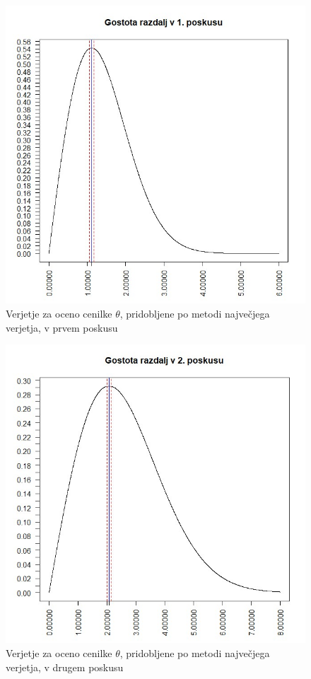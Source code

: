 \documentclass[a4paper, 10pt]{article}
\begin{document}
	\begin{figure}[h!]
		\label{fig: 2Dplot1}
		\centering
		\includegraphics[scale = 0.4]{VerjetjeMNV1}
		\caption{Verjetje za oceno cenilke $\theta$, pridobljene po metodi največjega verjetja, v prvem poskusu}
	\end{figure}

	\begin{figure}[h!]
		\label{fig: 2Dplot2}
		\centering
		\includegraphics[scale = 0.4]{VerjetjeMNV2}
		\caption{Verjetje za oceno cenilke $\theta$, pridobljene po metodi največjega verjetja, v drugem poskusu}
	\end{figure}
\end{document}
